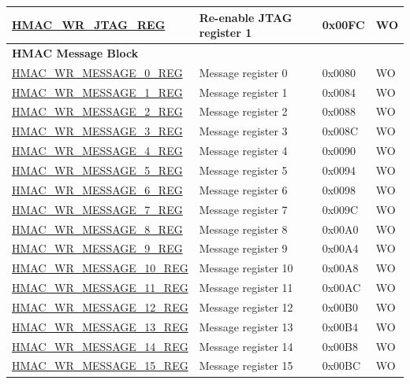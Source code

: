 \begin{longtable}{ | p{6cm} | p{7.2cm} | p{1.3cm} | p{1cm} | }
\\ \hline
\hyperref[regdesc:HMACWRJTAGREG]{HMAC\_WR\_JTAG\_REG} & Re-enable JTAG register 1 & 0x00FC & WO \\ \hline
\multicolumn{4}{|l|}{\textbf{HMAC Message Block}} \\ \hline
\hyperref[regdesc:HMACWRMESSAGENREG]{HMAC\_WR\_MESSAGE\_0\_REG} & Message register 0 & 0x0080 & WO \\ \hline
\hyperref[regdesc:HMACWRMESSAGENREG]{HMAC\_WR\_MESSAGE\_1\_REG} & Message register 1 & 0x0084 & WO \\ \hline
\hyperref[regdesc:HMACWRMESSAGENREG]{HMAC\_WR\_MESSAGE\_2\_REG} & Message register 2 & 0x0088 & WO \\ \hline
\hyperref[regdesc:HMACWRMESSAGENREG]{HMAC\_WR\_MESSAGE\_3\_REG} & Message register 3 & 0x008C & WO \\ \hline
\hyperref[regdesc:HMACWRMESSAGENREG]{HMAC\_WR\_MESSAGE\_4\_REG} & Message register 4 & 0x0090 & WO \\ \hline
\hyperref[regdesc:HMACWRMESSAGENREG]{HMAC\_WR\_MESSAGE\_5\_REG} & Message register 5 & 0x0094 & WO \\ \hline
\hyperref[regdesc:HMACWRMESSAGENREG]{HMAC\_WR\_MESSAGE\_6\_REG} & Message register 6 & 0x0098 & WO \\ \hline
\hyperref[regdesc:HMACWRMESSAGENREG]{HMAC\_WR\_MESSAGE\_7\_REG} & Message register 7 & 0x009C & WO \\ \hline
\hyperref[regdesc:HMACWRMESSAGENREG]{HMAC\_WR\_MESSAGE\_8\_REG} & Message register 8 & 0x00A0 & WO \\ \hline
\hyperref[regdesc:HMACWRMESSAGENREG]{HMAC\_WR\_MESSAGE\_9\_REG} & Message register 9 & 0x00A4 & WO \\ \hline
\hyperref[regdesc:HMACWRMESSAGENREG]{HMAC\_WR\_MESSAGE\_10\_REG} & Message register 10 & 0x00A8 & WO \\ \hline
\hyperref[regdesc:HMACWRMESSAGENREG]{HMAC\_WR\_MESSAGE\_11\_REG} & Message register 11 & 0x00AC & WO \\ \hline
\hyperref[regdesc:HMACWRMESSAGENREG]{HMAC\_WR\_MESSAGE\_12\_REG} & Message register 12 & 0x00B0 & WO \\ \hline
\hyperref[regdesc:HMACWRMESSAGENREG]{HMAC\_WR\_MESSAGE\_13\_REG} & Message register 13 & 0x00B4 & WO \\ \hline
\hyperref[regdesc:HMACWRMESSAGENREG]{HMAC\_WR\_MESSAGE\_14\_REG} & Message register 14 & 0x00B8 & WO \\ \hline
\hyperref[regdesc:HMACWRMESSAGENREG]{HMAC\_WR\_MESSAGE\_15\_REG} & Message register 15 & 0x00BC & WO \\ \hline

\end{longtable}
